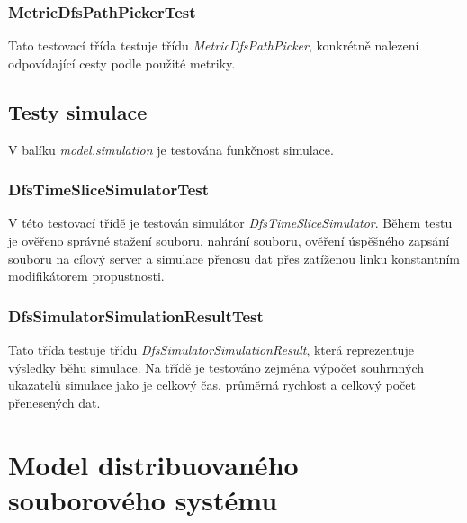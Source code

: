 \documentclass[czech,DP]{thesiskiv}
\begin{document}
\subsubsection*{MetricDfsPathPickerTest}

Tato testovací třída testuje třídu \textit{MetricDfsPathPicker}, konkrétně nalezení odpovídající cesty podle použité metriky.

\subsection{Testy simulace}

V balíku \textit{model.simulation} je testována funkčnost simulace.

\subsubsection*{DfsTimeSliceSimulatorTest}

V této testovací třídě je testován simulátor \textit{DfsTimeSliceSimulator}. Během testu je ověřeno správné stažení souboru, nahrání souboru, ověření úspěšného zapsání souboru na cílový server a simulace přenosu dat přes zatíženou linku konstantním modifikátorem propustnosti.

\subsubsection*{DfsSimulatorSimulationResultTest}

Tato třída testuje třídu \textit{DfsSimulatorSimulationResult}, která reprezentuje výsledky běhu simulace. Na třídě je testováno zejména výpočet souhrnných ukazatelů simulace jako je celkový čas, průměrná rychlost a celkový počet přenesených dat.

\section{Model distribuovaného souborového systému}
\end{document}
